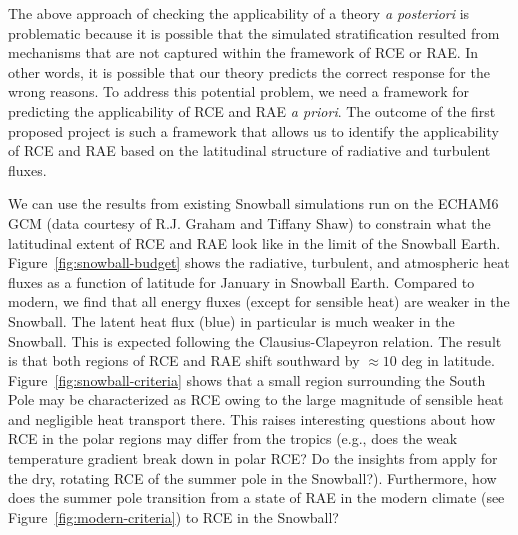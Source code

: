 \documentclass{article}
\begin{document}
The above approach of checking the applicability of a theory \textit{a posteriori} is problematic because it is possible that the simulated stratification resulted from mechanisms that are not captured within the framework of RCE or RAE. In other words, it is possible that our theory predicts the correct response for the wrong reasons. To address this potential problem, we need a framework for predicting the applicability of RCE and RAE \textit{a priori}. The outcome of the first proposed project is such a framework that allows us to identify the applicability of RCE and RAE based on the latitudinal structure of radiative and turbulent fluxes.

We can use the results from existing Snowball simulations run on the ECHAM6 GCM (data courtesy of R.J. Graham and Tiffany Shaw) to constrain what the latitudinal extent of RCE and RAE look like in the limit of the Snowball Earth. Figure~\ref{fig:snowball-budget} shows the radiative, turbulent, and atmospheric heat fluxes as a function of latitude for January in Snowball Earth. Compared to modern, we find that all energy fluxes (except for sensible heat) are weaker in the Snowball. The latent heat flux (blue) in particular is much weaker in the Snowball. This is expected following the Clausius-Clapeyron relation. The result is that both regions of RCE and RAE shift southward by $\approx 10$ deg in latitude. Figure~\ref{fig:snowball-criteria} shows that a small region surrounding the South Pole may be characterized as RCE owing to the large magnitude of sensible heat and negligible heat transport there. This raises interesting questions about how RCE in the polar regions may differ from the tropics (e.g., does the weak temperature gradient break down in polar RCE? Do the insights from \citet{cronin-chavas-2019} apply for the dry, rotating RCE of the summer pole in the Snowball?). Furthermore, how does the summer pole transition from a state of RAE in the modern climate (see Figure~\ref{fig:modern-criteria}) to RCE in the Snowball?
\end{document}
